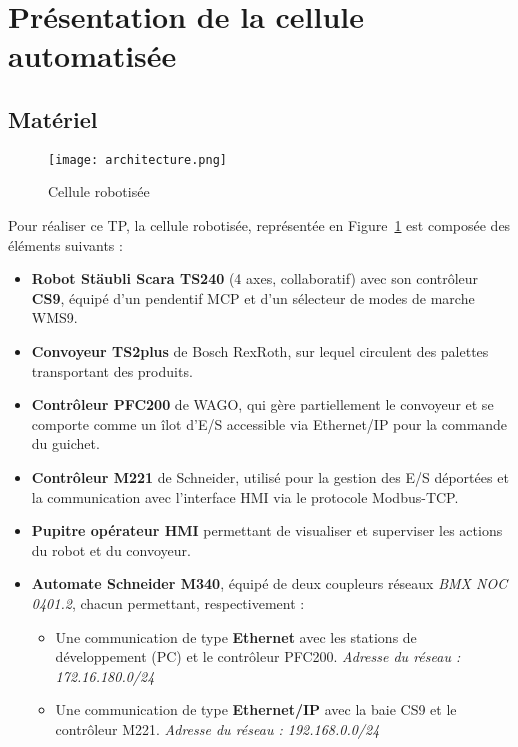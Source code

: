 \section{Présentation de la cellule automatisée}
\subsection{Matériel}

\begin{figure}[ht]
    \centering
    \texttt{[image: architecture.png]}
    \caption{Cellule robotisée}
    \label{fig:cellule}
\end{figure}


Pour réaliser ce TP, la cellule robotisée, représentée en Figure~\ref{fig:cellule} est composée des éléments suivants :

\begin{itemize}
    \item \textbf{Robot Stäubli Scara TS240} (4 axes, collaboratif) avec son contrôleur \textbf{CS9}, équipé d'un pendentif MCP et d'un sélecteur de modes de marche WMS9.
    \item \textbf{Convoyeur TS2plus} de Bosch RexRoth, sur lequel circulent des palettes transportant des produits.
    \item \textbf{Contrôleur PFC200} de WAGO, qui gère partiellement le convoyeur et se comporte comme un îlot d'E/S accessible via Ethernet/IP pour la commande du guichet.
    \item \textbf{Contrôleur M221} de Schneider, utilisé pour la gestion des E/S déportées et la communication avec l'interface HMI via le protocole Modbus-TCP.
    \item \textbf{Pupitre opérateur HMI} permettant de visualiser et superviser les actions du robot et du convoyeur.
    \item \textbf{Automate Schneider M340}, équipé de deux coupleurs réseaux \textit{BMX NOC 0401.2}, chacun permettant, respectivement : 
    \begin{itemize}
        \item Une communication de type \textbf{Ethernet} avec les stations de développement (PC) et le contrôleur PFC200. \textit{Adresse du réseau : 172.16.180.0/24}
        \item Une communication de type \textbf{Ethernet/IP} avec la baie CS9 et le contrôleur M221. \textit{Adresse du réseau : 192.168.0.0/24}
    \end{itemize}
\end{itemize}



